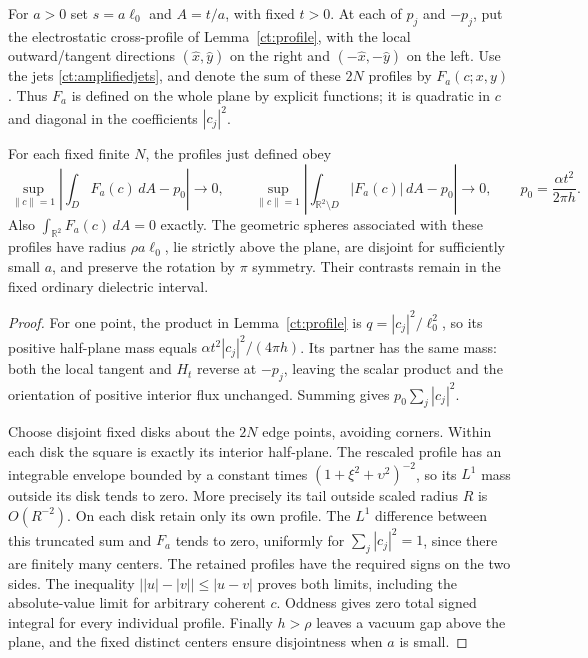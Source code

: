 For $a>0$ set $s=a\ell_0$ and $A=t/a$, with fixed $t>0$.
At each of $p_j$ and $-p_j$, put the electrostatic cross-profile of
Lemma~\ref{ct:profile}, with the local outward/tangent directions
$(\widehat x,\widehat y)$ on the right and
$(-\widehat x,-\widehat y)$ on the left. Use the jets
\eqref{ct:amplifiedjets}, and denote the sum of these $2N$ profiles
by $F_a(c;x,y)$. Thus $F_a$ is defined on the whole plane by
explicit functions; it is quadratic in $c$ and diagonal in the
coefficients $|c_j|^2$.

\begin{proposition}
\label{ct:model}
For each fixed finite $N$, the profiles just defined obey
\begin{equation}\label{ct:modellimits}
 \sup_{\|c\|=1}\left|\int_D F_a(c)\,dA-p_0\right|\longrightarrow0,
 \qquad
 \sup_{\|c\|=1}\left|\int_{\mathbb R^2\setminus D}|F_a(c)|\,dA-p_0\right|
       \longrightarrow0,
 \qquad p_0=\frac{\alpha t^2}{2\pi h}.
\end{equation}
Also $\int_{\mathbb R^2}F_a(c)\,dA=0$ exactly. The geometric spheres
associated with these profiles have radius $\rho a\ell_0$, lie
strictly above the plane, are disjoint for sufficiently small $a$,
and preserve the rotation by $\pi$ symmetry. Their contrasts remain
in the fixed ordinary dielectric interval.
\end{proposition}
\begin{proof}
For one point, the product in Lemma~\ref{ct:profile} is
$q=|c_j|^2/\ell_0^2$, so its positive half-plane mass equals
$\alpha t^2|c_j|^2/(4\pi h)$. Its partner has the same mass:
both the local tangent and $H_t$ reverse at $-p_j$, leaving the
scalar product and the orientation of positive interior flux unchanged.
Summing gives $p_0\sum_j|c_j|^2$.

Choose disjoint fixed disks about the $2N$ edge points, avoiding
corners. Within each disk the square is exactly its interior
half-plane. The rescaled profile has an integrable envelope bounded
by a constant times $(1+\xi^2+\upsilon^2)^{-2}$, so its $L^1$ mass
outside its disk tends to zero. More precisely its tail outside
scaled radius $R$ is $O(R^{-2})$. On each disk retain only its own
profile. The $L^1$ difference between this truncated sum and $F_a$
tends to zero, uniformly for $\sum_j|c_j|^2=1$, since there are
finitely many centers. The retained profiles have the required
signs on the two sides. The inequality
$\bigl||u|-|v|\bigr|\leq|u-v|$ proves both limits, including the
absolute-value limit for arbitrary coherent $c$.
Oddness gives zero total signed integral for every individual
profile. Finally $h>\rho$ leaves a vacuum gap above the plane,
and the fixed distinct centers ensure disjointness when $a$ is small.
\end{proof}

